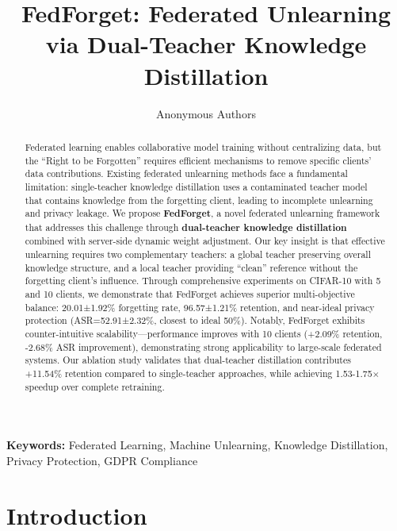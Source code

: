 \documentclass{article}
\title{FedForget: Federated Unlearning via Dual-Teacher Knowledge Distillation}
\author{
  Anonymous Authors\\
}
\begin{document}
\maketitle


\begin{abstract}
Federated learning enables collaborative model training without centralizing data, but the ``Right to be Forgotten'' requires efficient mechanisms to remove specific clients' data contributions. Existing federated unlearning methods face a fundamental limitation: single-teacher knowledge distillation uses a contaminated teacher model that contains knowledge from the forgetting client, leading to incomplete unlearning and privacy leakage. We propose \textbf{FedForget}, a novel federated unlearning framework that addresses this challenge through \textbf{dual-teacher knowledge distillation} combined with server-side dynamic weight adjustment. Our key insight is that effective unlearning requires two complementary teachers: a global teacher preserving overall knowledge structure, and a local teacher providing ``clean'' reference without the forgetting client's influence. Through comprehensive experiments on CIFAR-10 with 5 and 10 clients, we demonstrate that FedForget achieves superior multi-objective balance: 20.01±1.92\% forgetting rate, 96.57±1.21\% retention, and near-ideal privacy protection (ASR=52.91±2.32\%, closest to ideal 50\%). Notably, FedForget exhibits counter-intuitive scalability—performance improves with 10 clients (+2.09\% retention, -2.68\% ASR improvement), demonstrating strong applicability to large-scale federated systems. Our ablation study validates that dual-teacher distillation contributes +11.54\% retention compared to single-teacher approaches, while achieving 1.53-1.75$\times$ speedup over complete retraining.
\end{abstract}

\textbf{Keywords:} Federated Learning, Machine Unlearning, Knowledge Distillation, Privacy Protection, GDPR Compliance


\section{Introduction}
\label{sec:introduction}
\end{document}
